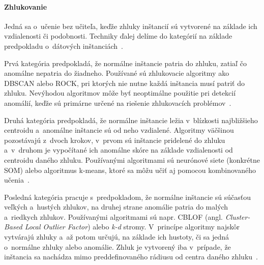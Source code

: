 \documentclass[a4paper,twoside,slovak,12pt,appendix]{article}
\begin{document}
\paragraph{Zhlukovanie}
Jedná sa o~učenie bez učiteľa, keďže zhluky inštancií sú vytvorené na základe
ich vzdialenosti či podobnosti. Techniky ďalej delíme do kategórií na základe
predpokladu o~dátových inštanciách~\cite{Chandola2009,Tan2005}.

Prvá kategória predpokladá, že normálne inštancie patria do zhluku, zatiaľ čo
anomálne nepatria do žiadneho. Používané sú zhlukovacie algoritmy ako DBSCAN
alebo ROCK, pri ktorých nie nutne každá inštancia musí patriť do zhluku.
Nevýhodou algoritmov môže byť neoptimálne použitie pri detekcií
anomálií, keďže sú primárne určené na riešenie zhlukovacích
problémov~\cite{Chandola2009}.

Druhá kategória predpokladá, že normálne inštancie ležia v~blízkosti
najbližšieho centroidu a~anomálne inštancie sú od neho vzdialené. Algoritmy
väčšinou pozostávajú z~dvoch krokov, v~prvom sú inštancie pridelené do zhluku
a~v~druhom je vypočítané ich anomálne skóre na základe vzdialenosti od centroidu
daného zhluku. Používanými algoritmami sú neurónové siete (konkrétne SOM) alebo
algoritmus k-means, ktoré sa môžu učiť aj pomocou kombinovaného
učenia~\cite{Chandola2009}.

Posledná kategória pracuje s~predpokladom, že normálne inštancie sú súčasťou
veľkých a~hustých zhlukov, na druhej strane anomálie patria do malých a~riedkych
zhlukov. Používanými algoritmami sú napr. CBLOF
(angl. \textit{Cluster-Based Local Outlier Factor}) alebo \textit{k-d} stromy.
V~princípe algoritmy najskôr vytvárajú zhluky a~až potom určujú, na základe ich
hustoty, či sa jedná o~normálne zhluky alebo anomálie. Zhluk je vytvorený iba
v~prípade, že inštancia sa nachádza mimo preddefinovaného rádiusu od centra
daného zhluku~\cite{Salvador2005}.


\end{document}
